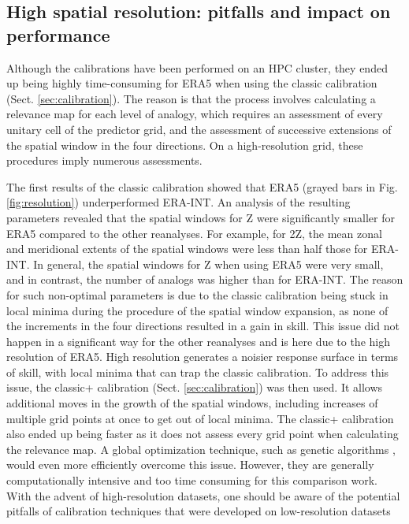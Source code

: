 \documentclass[alpha-refs]{wiley-article}
\begin{document}
\subsection{High spatial resolution: pitfalls and impact on performance}
\label{sec:results_hires}

Although the calibrations have been performed on an HPC cluster, they ended up being highly time-consuming for ERA5 when using the classic calibration (Sect. \ref{sec:calibration}). The reason is that the process involves calculating a relevance map for each level of analogy, which requires an assessment of every unitary cell of the predictor grid, and the assessment of successive extensions of the spatial window in the four directions. On a high-resolution grid, these procedures imply numerous assessments.

The first results of the classic calibration showed that ERA5 (grayed bars in Fig. \ref{fig:resolution}) underperformed ERA-INT. An analysis of the resulting parameters revealed that the spatial windows for Z were significantly smaller for ERA5 compared to the other reanalyses. For example, for 2Z, the mean zonal and meridional extents of the spatial windows were less than half those for ERA-INT. In general, the spatial windows for Z when using ERA5 were very small, and in contrast, the number of analogs was higher than for ERA-INT. The reason for such non-optimal parameters is due to the classic calibration being stuck in local minima during the procedure of the spatial window expansion, as none of the increments in the four directions resulted in a gain in skill. This issue did not happen in a significant way for the other reanalyses and is here due to the high resolution of ERA5. High resolution generates a noisier response surface in terms of skill, with local minima that can trap the classic calibration. To address this issue, the classic+ calibration (Sect. \ref{sec:calibration}) was then used. It allows additional moves in the growth of the spatial windows, including increases of multiple grid points at once to get out of local minima. The classic+ calibration also ended up being faster as it does not assess every grid point when calculating the relevance map. A global optimization technique, such as genetic algorithms \citep{Horton2017a}, would even more efficiently overcome this issue. However, they are generally computationally intensive and too time consuming for this comparison work. With the advent of high-resolution datasets, one should be aware of the potential pitfalls of calibration techniques that were developed on low-resolution datasets
\end{document}
